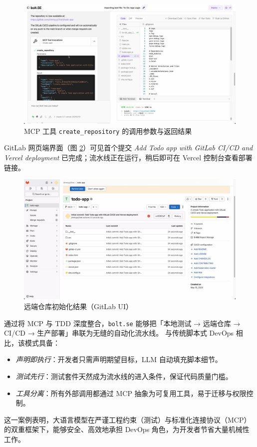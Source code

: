 \begin{figure}[htbp]
  \centering
  \includegraphics[width=.8\textwidth]{figures/screenshots/ci-cd/mcp_invocation.png}
  \caption{MCP 工具 \texttt{create\_repository} 的调用参数与返回结果}
  \label{fig:mcp_invocation}
\end{figure}

GitLab 网页端界面（图 \ref{fig:gitlab_repo}）可见首个提交 \textit{Add Todo app with GitLab CI/CD and Vercel deployment} 已完成；流水线正在运行，稍后即可在 Vercel 控制台查看部署链接。

\begin{figure}[htbp]
  \centering
  \includegraphics[width=.8\textwidth]{figures/screenshots/ci-cd/gitlab_repo.png}
  \caption{远端仓库初始化结果（GitLab UI）}
  \label{fig:gitlab_repo}
\end{figure}

通过将 MCP 与 TDD 深度整合，\texttt{bolt.se} 能够把「本地测试 → 远端仓库 → CI/CD → 生产部署」串联为无缝的自动化流水线。  
与传统脚本式 DevOps 相比，该模式具备：

\begin{itemize}
  \item \emph{声明即执行}：开发者只需声明期望目标，LLM 自动填充脚本细节。  
  \item \emph{测试先行}：测试套件天然成为流水线的进入条件，保证代码质量门槛。  
  \item \emph{工具分离}：所有外部调用都通过 MCP 抽象为可复用工具，易于迁移与权限控制。  
\end{itemize}

这一案例表明，大语言模型在严谨工程约束（测试）与标准化连接协议（MCP）的双重框架下，能够安全、高效地承担 DevOps 角色，为开发者节省大量机械性工作。